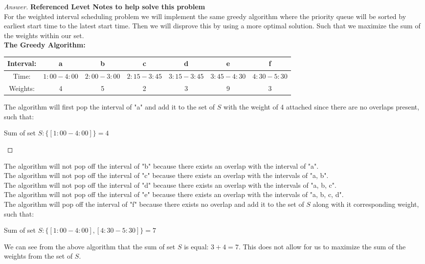 \documentclass[11pt]{article}
\theoremstyle{definition}
\theoremstyle{definition}
\theoremstyle{definition}
\begin{document}
\begin{proof}[Answer] \textbf{Referenced Levet Notes to help solve this problem} \\
For the weighted interval scheduling problem we will implement the same greedy algorithm where the priority queue will be sorted by earliest start time to the latest start time. Then we will disprove this by using a more optimal solution. Such that we maximize the sum of the weights within our set. \\
\textbf{The Greedy Algorithm:}\\
\begin{center}
\begin{tabular}{ | c | c | c | c | c | c | c | }
 \hline
 Interval:& a & b & c & d & e & f\\  
 \hline
 Time: & $1:00 - 4:00$ & $2:00 - 3:00$ & $2:15 - 3:45$ & $3:15 - 3:45$ & $3:45 - 4:30$ & $4:30 - 5:30$\\
  \hline
  Weights: & 4 & 5 & 2 & 3 & 9 & 3 \\
  \hline
\end{tabular}
\end{center}
The algorithm will first pop the interval of "a" and add it to the set of $S$ with the weight of 4 attached since there are no overlaps present, such that: \\
\begin{center}
Sum of set $S: \{[1:00 - 4: 00]\} = 4$\\
\end{center}
\end{proof}

The algorithm will not pop off the interval of "b" because there exists an overlap with the interval of "a". \\
The algorithm will not pop off the interval of "c" because there exists an overlap with the intervals of "a, b". \\
The algorithm will not pop off the interval of "d" because there exists an overlap with the intervals of "a, b, c". \\
The algorithm will not pop off the interval of "e" because there exists an overlap with the intervals of "a, b, c, d". \\

The algorithm will pop off the interval of "f" because there exists no overlap and add it to the set of $S$ along with it corresponding weight, such that: \\
\begin{center}
Sum of set $S: \{[1:00 - 4: 00], [4:30 - 5:30]\} = 7$\\
\end{center}
We can see from the above algorithm that the sum of set $S$ is equal: $3 + 4 = 7$. This does not allow for us to maximize the sum of the weights from the set of $S$. \\
\end{document}
